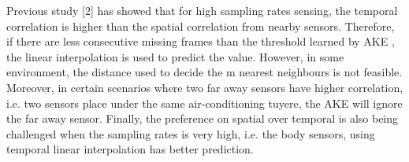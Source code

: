 Previous study [2] has showed that for high sampling rates sensing, the temporal correlation is higher than the spatial correlation from nearby sensors. 
Therefore, if there are less consecutive missing frames than the threshold learned by AKE , the linear interpolation is used to predict the value. 
However, in some environment, the distance used to decide the m nearest neighbours is not feasible. 
Moreover, in certain scenarios where two far away sensors have higher correlation, i.e. two sensors place under the same air-conditioning tuyere, the AKE will ignore the far away sensor.
Finally, the preference on spatial over temporal is also being challenged when the sampling rates is very high, i.e. the body sensors, using temporal linear interpolation has better prediction.   


